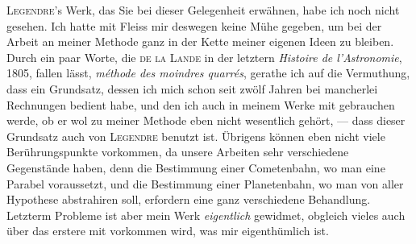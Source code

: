\par\indent \textsc{Legendre}'s Werk, das Sie bei dieser Gelegenheit erwähnen, habe ich noch nicht gesehen. Ich hatte mit Fleiss mir deswegen keine Mühe gegeben, um bei der Arbeit an meiner Methode ganz in der Kette meiner eigenen Ideen zu bleiben. Durch ein paar Worte, die \textsc{de la Lande} in der letztern \emph{Histoire de l'Astronomie}, 1805, fallen lässt, \emph{méthode des moindres quarrés}, gerathe ich auf die Vermuthung, dass ein Grundsatz, dessen ich mich schon seit zwölf Jahren bei mancherlei Rechnungen bedient habe, und den ich auch in meinem Werke mit gebrauchen werde, ob er wol zu meiner Methode eben nicht wesentlich gehört, --- dass dieser Grundsatz auch von \textsc{Legendre} benutzt ist. Übrigens können eben nicht viele Berührungspunkte vorkommen, da unsere Arbeiten sehr verschiedene Gegenstände haben, denn die Bestimmung einer Cometenbahn, wo man eine Parabel voraussetzt, und die Bestimmung einer Planetenbahn, wo man von aller Hypothese abstrahiren soll, erfordern eine ganz verschiedene Behandlung. Letzterm Probleme ist aber mein Werk \emph{eigentlich} gewidmet, obgleich vieles auch über das erstere mit vorkommen wird, was mir eigenthümlich ist.

